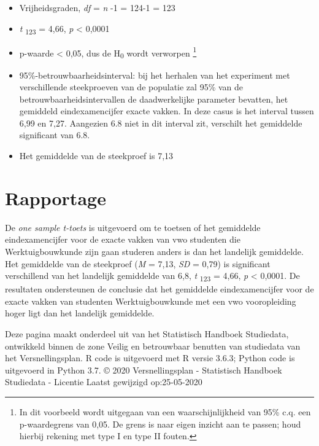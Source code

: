 \documentclass[
]{article}
\providecommand{\tightlist}{%
  \setlength{\itemsep}{0pt}\setlength{\parskip}{0pt}}
\begin{document}
\begin{itemize}
\tightlist
\item
  Vrijheidsgraden, \emph{df} = \emph{n} -1 = 124-1 = 123\\
\item
  \emph{t} \textsubscript{123} = 4,66, \emph{p} \textless{} 0,0001
\item
  p-waarde \textless{} 0,05, dus de H\textsubscript{0} wordt verworpen
  \footnote{In dit voorbeeld wordt uitgegaan van een waarschijnlijkheid
    van 95\% c.q. een p-waardegrens van 0,05. De grens is naar eigen
    inzicht aan te passen; houd hierbij rekening met type I en type II
    fouten.}
\item
  95\%-betrouwbaarheidsinterval: bij het herhalen van het experiment met
  verschillende steekproeven van de populatie zal 95\% van de
  betrouwbaarheidsintervallen de daadwerkelijke parameter bevatten, het
  gemiddeld eindexamencijfer exacte vakken. In deze casus is het
  interval tussen 6,99 en 7,27. Aangezien 6.8 niet in dit interval zit,
  verschilt het gemiddelde significant van 6.8.
\item
  Het gemiddelde van de steekproef is 7,13 
\end{itemize}

\hypertarget{rapportage}{%
\section{Rapportage}\label{rapportage}}

De \emph{one sample t-toets} is uitgevoerd om te toetsen of het
gemiddelde eindexamencijfer voor de exacte vakken van vwo studenten die
Werktuigbouwkunde zijn gaan studeren anders is dan het landelijk
gemiddelde. Het gemiddelde van de steekproef (\emph{M} = 7,13, \emph{SD}
= 0,79) is significant verschillend van het landelijk gemiddelde van
6,8, \emph{t} \textsubscript{123} = 4,66, \emph{p} \textless{} 0,0001.
De resultaten ondersteunen de conclusie dat het gemiddelde
eindexamencijfer voor de exacte vakken van studenten Werktuigbouwkunde
met een vwo vooropleiding hoger ligt dan het landelijk gemiddelde.

\leavevmode\hypertarget{footer}{}%
Deze pagina maakt onderdeel uit van het Statistisch Handboek Studiedata,
ontwikkeld binnen de zone Veilig en betrouwbaar benutten van studiedata
van het Versnellingsplan. R code is uitgevoerd met R versie 3.6.3;
Python code is uitgevoerd in Python 3.7. © 2020 Versnellingsplan -
Statistisch Handboek Studiedata - Licentie Laatst gewijzigd
op:25-05-2020
\end{document}
